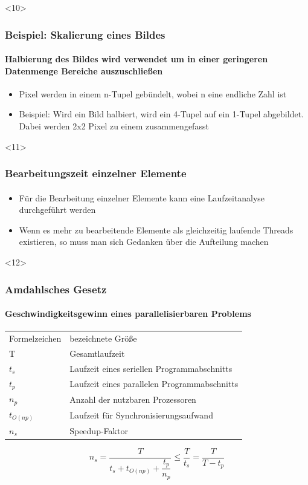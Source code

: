 \documentclass{beamer}
\begin{document}
\begin{frame}<10>
  \frametitle{Beispiel: Skalierung eines Bildes}
  \framesubtitle{Halbierung des Bildes wird verwendet um in einer geringeren Datenmenge Bereiche auszuschließen}

  \begin{itemize}
    \item Pixel werden in einem n-Tupel gebündelt, wobei n eine endliche Zahl ist 
    \item Beispiel: Wird ein Bild halbiert, wird ein 4-Tupel auf ein 1-Tupel abgebildet. Dabei werden 2x2 Pixel zu einem zusammengefasst
  \end{itemize}
  
\end{frame}


\begin{frame}<11>
  \frametitle{Bearbeitungszeit einzelner Elemente}
  \framesubtitle{}
  
  \begin{itemize}
    \item Für die Bearbeitung einzelner Elemente kann eine Laufzeitanalyse durchgeführt werden
    \item Wenn es mehr zu bearbeitende Elemente als gleichzeitig laufende Threads existieren, so muss man sich Gedanken über die Aufteilung machen
  \end{itemize}

\end{frame}

\begin{frame}<12>
  \frametitle{Amdahlsches Gesetz}
  \framesubtitle{Geschwindigkeitsgewinn eines parallelisierbaren Problems}

  \begin{center}
    \begin{table}[]
      \begin{tabular}{ll}
        Formelzeichen & bezeichnete Größe \\
        T & Gesamtlaufzeit \\
        $t_s$ & Laufzeit eines seriellen Programmabschnitts \\
        $t_p$ & Laufzeit eines parallelen Programmabschnitts \\
        $n_p$ & Anzahl der nutzbaren Prozessoren \\
        $t_{O(np)}$ & Laufzeit für Synchronisierungsaufwand \\
        $n_s$ & Speedup-Faktor \\
      \end{tabular}
    \end{table}
  \end{center}
  
  \begin{center}
    \[ n_s = \dfrac{T}{t_s+t_{O(np)}+\dfrac{t_p}{n_p}} \leq \dfrac{T}{t_s} = \dfrac{T}{T-t_p} \]
  \end{center}
  
\end{frame}
\end{document}
